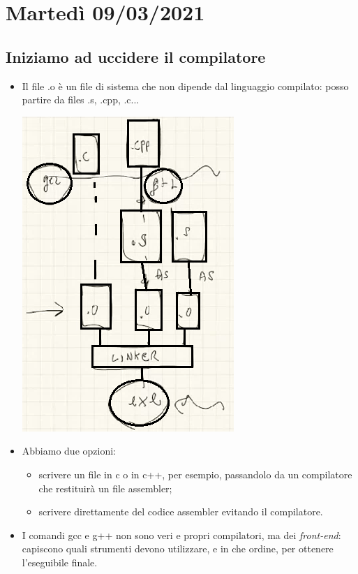 \chapter{Martedì 09/03/2021}
\section{Iniziamo ad uccidere il compilatore}
\begin{itemize}
	\item Il file .o è un file di sistema che non dipende dal linguaggio compilato: posso partire da files .s, .cpp, .c...
	\begin{center}
		\includegraphics[scale=0.90]{img/12.PNG}
	\end{center} 
	\item Abbiamo due opzioni:
	\begin{itemize}
		\item scrivere un file in c o in c++, per esempio, passandolo da un compilatore che restituirà un file assembler;
		\item scrivere direttamente del codice assembler evitando il compilatore.
	\end{itemize}
	\item I comandi gcc e g++ non sono veri e propri compilatori, ma dei \emph{front-end}: capiscono quali strumenti devono utilizzare, e in che ordine, per ottenere l'eseguibile  finale.
\end{itemize}
\clearpage

